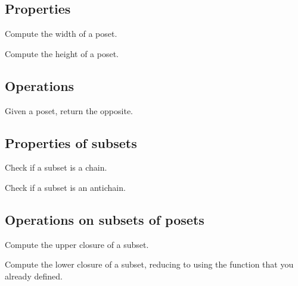 \subsection{Properties}


\begin{gradedexercise}
Compute the width of a poset.
\end{gradedexercise}

\begin{gradedexercise}
Compute the height of a poset.
\end{gradedexercise}

\subsection{Operations}


\begin{gradedexercise}
Given a poset, return the opposite.
\end{gradedexercise}

\subsection{Properties of subsets}


\begin{gradedexercise}
Check if a subset is a chain.
\end{gradedexercise}

\begin{gradedexercise}
Check if a subset is an antichain.
\end{gradedexercise}

\subsection{Operations on subsets of posets}

\begin{gradedexercise}
Compute the upper closure of a subset.

\end{gradedexercise}


\begin{gradedexercise}
Compute the lower closure of a subset, reducing to
using the function  that you
already defined.

\end{gradedexercise}



